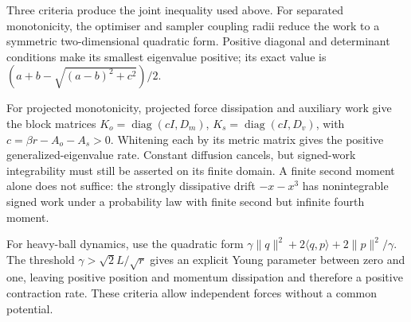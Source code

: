 \documentclass[11pt,a4paper]{report}
\begin{document}
Three criteria produce the joint inequality used above. For separated monotonicity, the optimiser and sampler coupling radii reduce the work to a symmetric two-dimensional quadratic form. Positive diagonal and determinant conditions make its smallest eigenvalue positive; its exact value is \((a+b-\sqrt{(a-b)^2+c^2})/2\).



For projected monotonicity, projected force dissipation and auxiliary work give the block matrices \(K_o=\operatorname{diag}(cI,D_m)\), \(K_s=\operatorname{diag}(cI,D_v)\), with \(c=\beta r-A_o-A_s>0\). Whitening each by its metric matrix gives the positive generalized-eigenvalue rate. Constant diffusion cancels, but signed-work integrability must still be asserted on its finite domain. A finite second moment alone does not suffice: the strongly dissipative drift \(-x-x^3\) has nonintegrable signed work under a probability law with finite second but infinite fourth moment.



For heavy-ball dynamics, use the quadratic form \(\gamma\|q\|^2+2\langle q,p\rangle+2\|p\|^2/\gamma\). The threshold \(\gamma>\sqrt2L/\sqrt r\) gives an explicit Young parameter between zero and one, leaving positive position and momentum dissipation and therefore a positive contraction rate. These criteria allow independent forces without a common potential.
\end{document}
